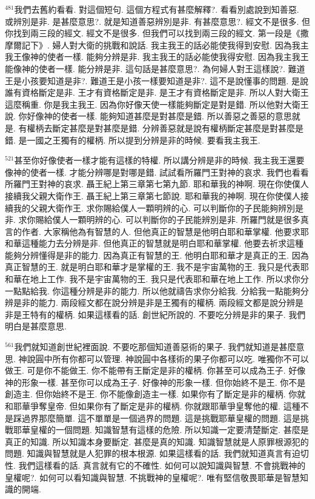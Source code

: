 \documentclass{book}
\begin{document}
$^{481}$我們去舊約看看.
對這個短句.
這個方程式有甚麼解釋?.
看看別處說到知善惡.
或辨別是非.
是甚麼意思?.
就是知道善惡辨別是非.
有甚麼意思?.
經文不是很多.
但你找到兩三段的經文.
經文不是很多.
但我們可以找到兩三段的經文.
第一段是《撒摩爾記下》.
婦人對大衛的挑戰和說話.
我主我王的話必能使我得到安慰.
因為我主我王像神的使者一樣.
能夠分辨是非.
我主我王的話必能使我得安慰.
因為我主我王能像神的使者一樣.
能分辨是非.
這句話是甚麼意思?.
為何婦人對王這樣說?.
難道王是小孩要知道是非?.
難道王是小孩一樣要知道是非?.
這不是說懂事的問題.
是說誰有資格斷定是非.
王才有資格斷定是非.
是王才有資格斷定是非.
所以人對大衛王這麼稱重.
你是我主我王.
因為你好像天使一樣能夠斷定是對是錯.
所以他對大衛王說.
你好像神的使者一樣.
能夠知道甚麼是對甚麼是錯.
所以善惡之善惡的意思就是.
有權柄去斷定甚麼是對甚麼是錯.
分辨善惡就是說有權柄斷定甚麼是對甚麼是錯.
是一國之王獨有的權柄.
所以提到分辨是非的時候.
要看我主我王.

$^{521}$甚至你好像使者一樣才能有這樣的特權.
所以講分辨是非的時候.
我主我王還要像神的使者一樣.
才能分辨哪是對哪是錯.
試試看所羅門王對神的哀求.
我們也看看所羅門王對神的哀求.
聶王紀上第三章第七第九節.
耶和華我的神啊.
現在你使僕人接續我父親大衛作王.
聶王紀上第三章第七節說.
耶和華我的神啊.
現在你使僕人接續我的父親大衛作王.
求你賜給僕人一顆明辨的心.
可以判斷你的子民能夠辨別是非.
求你賜給僕人一顆明辨的心.
可以判斷你的子民能辨別是非.
所羅門就是很多真言的作者.
大家稱他為有智慧的人.
但他真正的智慧是他明白耶和華掌權.
他要求耶和華這種能力去分辨是非.
但他真正的智慧就是明白耶和華掌權.
他要去祈求這種能夠分辨懂得是非的能力.
因為真正有智慧的王.
他明白耶和華才是真正的王.
因為真正智慧的王.
就是明白耶和華才是掌權的王.
我不是宇宙萬物的王.
我只是代表耶和華在地上工作.
我不是宇宙萬物的王.
我只是代表耶和華在地上工作.
所以求你分一點點給我.
你這種分辨是非的能力.
所以他就禱告求你分給我.
分給我一點能夠分辨是非的能力.
兩段經文都在說分辨是非是王獨有的權柄.
兩段經文都是說分辨是非是王特有的權柄.
如果這樣看的話.
創世紀所說的.
不要吃分辨是非的果子.
我們明白是甚麼意思.

$^{561}$我們就知道創世紀裡面說.
不要吃那個知道善惡術的果子.
我們就知道是甚麼意思.
神說圓中所有你都可以管理.
神說圓中各樣術的果子你都可以吃.
唯獨你不可以做王.
可是你不能做王.
你不能帶有王斷定是非的權柄.
你甚至可以成為王子.
好像神的形象一樣.
甚至你可以成為王子.
好像神的形象一樣.
但你始終不是王.
你不是創造主.
但你始終不是王.
你不能像創造主一樣.
如果你有了斷定是非的權柄.
你就和耶華爭奪皇帝.
但如果你有了斷定是非的權柄.
你就跟耶華爭皇奪他的權.
這種不是踩過界那麼簡單.
這不單單是一個過界的問題.
這是挑戰耶華皇權的問題.
這是挑戰耶華皇權的一個問題.
知識智慧有這樣的危險.
所以知識一定要清楚斷定.
甚麼是真正的知識.
所以知識本身要斷定.
甚麼是真的知識.
知識智慧就是人原罪根源犯的問題.
知識與智慧就是人犯罪的根本根源.
如果這樣看的話.
我們就知道真言有迫切性.
我們這樣看的話.
真言就有它的不確性.
如何可以說知識與智慧.
不會挑戰神的皇權呢?.
如何可以看知識與智慧.
不挑戰神的皇權呢?.
唯有堅信敬畏耶華是智慧知識的開端.
\end{document}
